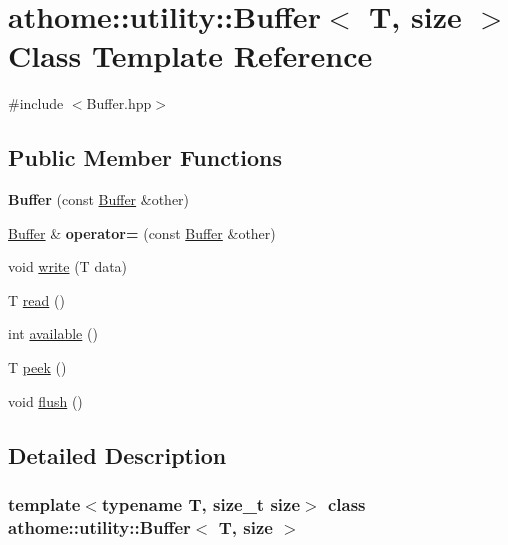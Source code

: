 \hypertarget{classathome_1_1utility_1_1_buffer}{}\section{athome\+:\+:utility\+:\+:Buffer$<$ T, size $>$ Class Template Reference}
\label{classathome_1_1utility_1_1_buffer}


{\ttfamily \#include $<$Buffer.\+hpp$>$}

\subsection*{Public Member Functions}
\begin{DoxyCompactItemize}
\item 
\mbox{\label{classathome_1_1utility_1_1_buffer_a1b2428314cc2ac68613241a55203a2e6}} 
{\bfseries Buffer} (const \mbox{\hyperlink{classathome_1_1utility_1_1_buffer}{Buffer}} \&other)
\item 
\mbox{\label{classathome_1_1utility_1_1_buffer_a42ab6c8ec0ada7bd76cce3f097b9564b}} 
\mbox{\hyperlink{classathome_1_1utility_1_1_buffer}{Buffer}} \& {\bfseries operator=} (const \mbox{\hyperlink{classathome_1_1utility_1_1_buffer}{Buffer}} \&other)
\item 
void \mbox{\hyperlink{classathome_1_1utility_1_1_buffer_a49f31b68580136d5600491bd11b1e55f}{write}} (T data)
\item 
T \mbox{\hyperlink{classathome_1_1utility_1_1_buffer_afc64f625641e7057b2a12dbf059cbd0c}{read}} ()
\item 
int \mbox{\hyperlink{classathome_1_1utility_1_1_buffer_a2c441e74e8e325e8eb6cfb7ffb04b157}{available}} ()
\item 
T \mbox{\hyperlink{classathome_1_1utility_1_1_buffer_a7cd2a38b3f2abc3083f686c49873656a}{peek}} ()
\item 
void \mbox{\hyperlink{classathome_1_1utility_1_1_buffer_a9fd6b0ad08ed7af5702b43c3b6a617e1}{flush}} ()
\end{DoxyCompactItemize}


\subsection{Detailed Description}
\subsubsection*{template$<$typename T, size\+\_\+t size$>$\newline
class athome\+::utility\+::\+Buffer$<$ T, size $>$}

